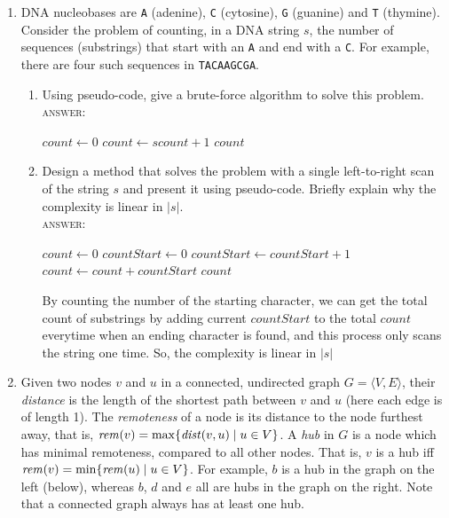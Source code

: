 \documentclass[11pt]{article}
\newcommand{\id}[1]{\mbox{\textit{#1}}}
\newcommand{\tuple}[1]{\langle #1 \rangle}
\begin{document}
\begin{enumerate}
\item
DNA nucleobases are
\texttt{A} (adenine),
\texttt{C} (cytosine),
\texttt{G} (guanine) and
\texttt{T} (thymine).
Consider the problem of counting, in a DNA string $s$,
the number of sequences (substrings)
that start with an \verb!A! and end with a \verb!C!.
For example, there are four such sequences in \verb!TACAAGCGA!.
\begin{enumerate}
\item
Using pseudo-code, give a brute-force algorithm to solve this problem.
\\
\textsc{answer}:
\par
\begin{algorithmic}
\State $count\gets 0$
        \State $count\gets scount+1$
      \EndIf
    \EndFor
  \EndIf
\EndFor
\Return $count$
\EndFunction
\end{algorithmic}
\item
Design a method that solves the problem with a single left-to-right
scan of the string $s$ and present it using pseudo-code.
Briefly explain why the complexity is linear in $|s|$.
\\
\textsc{answer}:
\par
\begin{algorithmic}
\State $count \gets 0$
\State $countStart \gets 0$
    \State $countStart \gets countStart + 1$
    \State $count \gets count + countStart$
  \EndIf
\EndFor
\Return $count$
\EndFunction
\end{algorithmic}
By counting the number of the starting character, we can get the total count of
substrings by adding current $countStart$ to the total $count$ everytime
when an ending character is found, and this process only scans the string one time.
So, the complexity is linear in $|s|$
\end{enumerate}

\item
Given two nodes $v$ and $u$ in a connected, undirected graph
$G = \tuple{V,E}$,
their \emph{distance} is the length of the shortest path between
$v$ and $u$ (here each edge is of length 1).
The \emph{remoteness} of a node is its distance to the node furthest away,
that is, $\id{rem}(v) = \max \{\id{dist}(v,u) \mid u \in V\}$.
A \emph{hub} in $G$ is a node which has minimal
remoteness, compared to all other nodes.
That is, $v$ is a hub iff
$\id{rem}(v) = \min \{\id{rem}(u) \mid u \in V\}$.
For example, $b$ is a hub in the graph on the left (below),
whereas $b$, $d$ and $e$ all are hubs in the graph on the right.
Note that a connected graph always has at least one hub.


\end{enumerate}
\end{document}
